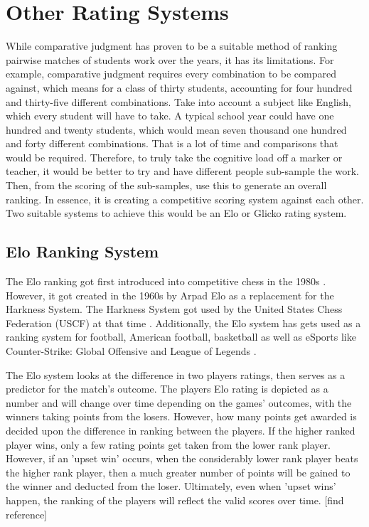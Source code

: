 	
	\section{Other Rating Systems}
	While comparative judgment has proven to be a suitable method of ranking pairwise matches of students work over the years, it has its limitations. For example, comparative judgment requires every combination to be compared against, which means for a class of thirty students, accounting for four hundred and thirty-five different combinations. Take into account a subject like English, which every student will have to take. A typical school year could have one hundred and twenty students, which would mean seven thousand one hundred and forty different combinations. That is a lot of time and comparisons that would be required. Therefore, to truly take the cognitive load off a marker or teacher, it would be better to try and have different people sub-sample the work. Then, from the scoring of the sub-samples, use this to generate an overall ranking. In essence, it is creating a competitive scoring system against each other. Two suitable systems to achieve this would be an Elo or Glicko rating system.
	
	\subsection{Elo Ranking System}
	The Elo ranking got first introduced into competitive chess in the 1980s \cite{weng2011bayesian}. However, it got created in the 1960s by Arpad Elo as a replacement for the Harkness System. The Harkness System got used by the United States Chess Federation (USCF) at that time \cite{elo1978rating}. Additionally, the Elo system has gets used as a ranking system for football, American football, basketball as well as eSports like Counter-Strike: Global Offensive and League of Legends \cite{silver2015we, pradhan2020power}.
	
	The Elo system looks at the difference in two players ratings, then serves as a predictor for the match's outcome. The players Elo rating is depicted as a number and will change over time depending on the games' outcomes, with the winners taking points from the losers. However, how many points get awarded is decided upon the difference in ranking between the players. If the higher ranked player wins, only a few rating points get taken from the lower rank player. However, if an 'upset win' occurs, when the considerably lower rank player beats the higher rank player, then a much greater number of points will be gained to the winner and deducted from the loser. Ultimately, even when 'upset wins' happen, the ranking of the players will reflect the valid scores over time. [find reference]
	
